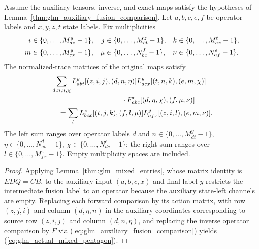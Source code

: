 \begin{lemma}
    \leanok
    \label{thm:glm_actual_mixed_pentagon}
    Assume the auxiliary tensors, inverse, and exact maps satisfy the
    hypotheses of Lemma~\ref{thm:glm_auxiliary_fusion_comparison}.
    Let $a,b,c,e,f$ be operator labels and $x,y,z,t$ state labels.
    Fix multiplicities
    \begin{align}
        i   & \in\{0,\ldots,M_{az}^{y}-1\},       &
        j   & \in\{0,\ldots,M_{bt}^{z}-1\},       &
        k   & \in\{0,\ldots,M_{cx}^{t}-1\},\notag   \\
        m   & \in\{0,\ldots,M_{ex}^{y}-1\},       &
        \mu & \in\{0,\ldots,N_{bc}^{f}-1\},       &
        \nu & \in\{0,\ldots,N_{af}^{e}-1\}.\notag
    \end{align}
    The normalized-trace matrices of the original maps satisfy
    \begin{align}
         & \sum_{d,n,\eta,\chi}
        L_{ab t}^{y}[(z,i,j),(d,n,\eta)]
        L_{dc x}^{y}[(t,n,k),(e,m,\chi)]\notag       \\
         & \hspace{35mm}\cdot
        F_{abc}^{e}[(d,\eta,\chi),(f,\mu,\nu)]\notag \\
         & \quad=\sum_l
        L_{bc x}^{z}[(t,j,k),(f,l,\mu)]
        L_{af x}^{y}[(z,i,l),(e,m,\nu)].
        \label{eq:glm_actual_mixed_pentagon}
    \end{align}
    The left sum ranges over operator labels $d$ and
    $n\in\{0,\ldots,M_{dt}^{y}-1\}$,
    $\eta\in\{0,\ldots,N_{ab}^{d}-1\}$,
    $\chi\in\{0,\ldots,N_{dc}^{e}-1\}$; the right sum ranges over
    $l\in\{0,\ldots,M_{fx}^{z}-1\}$. Empty multiplicity spaces are
    included.
\end{lemma}
\begin{proof}
    \leanok
    Applying Lemma~\ref{thm:glm_mixed_entries}, whose matrix identity is
    $EDQ=CB$, to the auxiliary input
    $(a,b,c,x)$ and final label $y$ restricts the intermediate fusion label
    to an operator because the auxiliary state-left channels are empty.
    Replacing each forward comparison by its action matrix, with
    row $(z,j,i)$ and column $(d,\eta,n)$ in the auxiliary coordinates
    corresponding to source row $(z,i,j)$ and column $(d,n,\eta)$, and
    replacing the inverse operator comparison by $F$ via
    (\ref{eq:glm_auxiliary_fusion_comparison}) yields
    (\ref{eq:glm_actual_mixed_pentagon}).
\end{proof}


